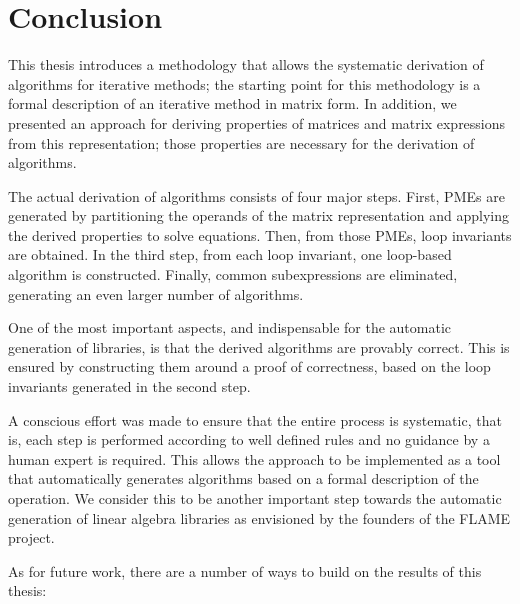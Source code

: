\chapter{Conclusion}
\label{chap:conclusion}



This thesis introduces a methodology that allows the systematic derivation of algorithms for iterative methods; the starting point for this methodology is a formal description of an iterative method in matrix form. In addition, we presented an approach for deriving properties of matrices and matrix expressions from this representation; those properties are necessary for the derivation of algorithms.

The actual derivation of algorithms consists of four major steps. First, PMEs are generated by partitioning the operands of the matrix representation and applying the derived properties to solve equations. Then, from those PMEs, loop invariants are obtained. In the third step, from each loop invariant, one loop-based algorithm is constructed. Finally, common subexpressions are eliminated, generating an even larger number of algorithms.

One of the most important aspects, and indispensable for the automatic generation of libraries, is that the derived algorithms are provably correct. This is ensured by constructing them around a proof of correctness, based on the loop invariants generated in the second step.

A conscious effort was made to ensure that the entire process is systematic, that is, each step is performed according to well defined rules and no guidance by a human expert is required. This allows the approach to be implemented as a tool that automatically generates algorithms based on a formal description of the operation. We consider this to be another important step towards the automatic generation of linear algebra libraries as envisioned by the founders of the FLAME project.

As for future work, there are a number of ways to build on the results of this thesis:

